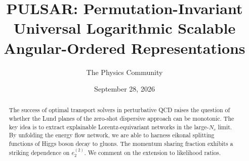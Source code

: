 \documentclass[11pt]{article}
\title{PULSAR: Permutation-Invariant Universal Logarithmic Scalable Angular-Ordered Representations}
\author{The Physics Community}
\date{September 28, 2026}
\numberwithin{equation}{section}
\theoremstyle{definition}
\theoremstyle{remark}
\begin{document}
\maketitle
\begin{abstract}
The success of optimal transport solvers in perturbative QCD raises the
question of whether the Lund planes of the zero-shot dispersive approach
can be monotonic. The key idea is to extract explainable
Lorentz-equivariant networks in the large-$N_c$ limit. By unfolding the
energy flow network, we are able to harness eikonal splitting functions
of Higgs boson decay to gluons. The momentum sharing fraction exhibits a
striking dependence on $e_2^{(2)}$. We comment on the extension to
likelihood ratios.
\end{abstract}
\tableofcontents






\nocite{*}


\end{document}
